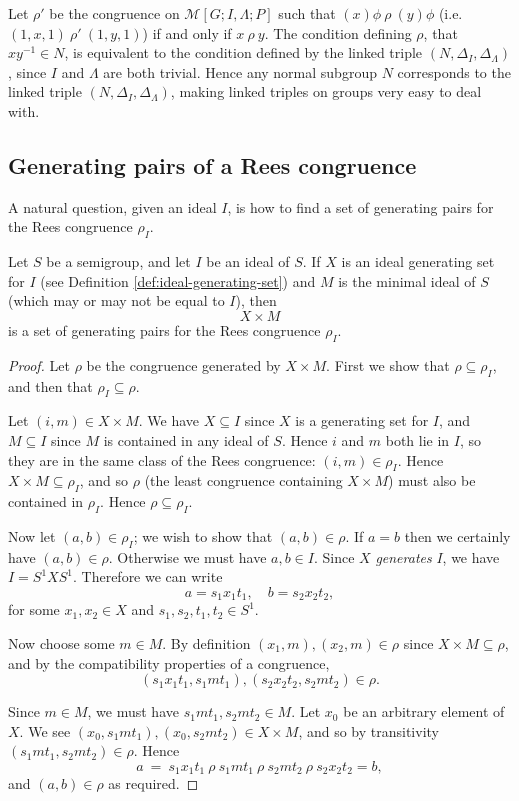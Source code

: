 Let $\rho'$ be the congruence on $\mathcal{M}[G; I, \Lambda; P]$ such that
$(x)\phi ~\rho~ (y)\phi$ (i.e.~$(1,x,1) ~\rho'~ (1,y,1)$) if and only if
$x ~\rho~ y$.  The condition defining $\rho$, that $xy^{-1} \in N$, is
equivalent to the condition defined by the linked triple
$(N, \Delta_I, \Delta_\Lambda)$, since $I$ and $\Lambda$ are both trivial.
Hence any normal subgroup $N$ corresponds to the linked triple
$(N, \Delta_I, \Delta_\Lambda)$, making linked triples on groups very easy to
deal with.

\subsection{Generating pairs of a Rees congruence}
\label{sec:rees-to-pairs}
A natural question, given an ideal $I$, is how to find a set of generating pairs
for the Rees congruence $\rho_I$.

\begin{theorem}
  Let $S$ be a semigroup, and let $I$ be an ideal of $S$.  If $X$ is an ideal
  generating set for $I$ (see Definition \ref{def:ideal-generating-set}) and $M$
  is the minimal ideal of $S$ (which may or may not be equal to $I$), then
  $$X \times M$$ is a set of generating pairs for the Rees congruence $\rho_I$.
  \begin{proof}
    Let $\rho$ be the congruence generated by $X \times M$.  First we show that
    $\rho \subseteq \rho_I$, and then that $\rho_I \subseteq \rho$.

    Let $(i,m) \in X \times M$.  We have $X \subseteq I$ since $X$ is a
    generating set for $I$, and $M \subseteq I$ since $M$ is contained in any
    ideal of $S$.  Hence $i$ and $m$ both lie in $I$, so they are in the same
    class of the Rees congruence: $(i,m) \in \rho_I$.  Hence $X \times M
    \subseteq \rho_I$, and so $\rho$ (the least congruence containing $X \times
    M$) must also be contained in $\rho_I$.  Hence $\rho \subseteq \rho_I$.

    Now let $(a,b) \in \rho_I$; we wish to show that $(a,b) \in \rho$.  If $a=b$
    then we certainly have $(a,b) \in \rho$.  Otherwise we must have $a,b \in
    I$.  Since $X$ \textit{generates} $I$, we have $I = S^1XS^1$.  Therefore we
    can write
    $$a = s_1x_1t_1, \quad b = s_2x_2t_2,$$
    for some $x_1,x_2 \in X$ and $s_1,s_2,t_1,t_2 \in S^1$.

    Now choose some $m \in M$.  By definition $(x_1,m), (x_2,m) \in \rho$ since
    $X \times M \subseteq \rho$, and
    by the compatibility properties of a congruence,
    $$(s_1x_1t_1,s_1mt_1), (s_2x_2t_2,s_2mt_2) \in \rho.$$

    Since $m \in M$, we must have $s_1mt_1,s_2mt_2 \in M$.  Let $x_0$ be an
    arbitrary element of $X$.
    We see $(x_0,s_1mt_1), (x_0,s_2mt_2) \in X \times M$, and so by transitivity
    $(s_1mt_1, s_2mt_2) \in \rho$.
    Hence
    $$a ~=~ s_1x_1t_1 ~\rho~ s_1mt_1 ~\rho~ s_2mt_2 ~\rho~ s_2x_2t_2 = b,$$
    and $(a,b) \in \rho$ as required.
  \end{proof}
\end{theorem}

